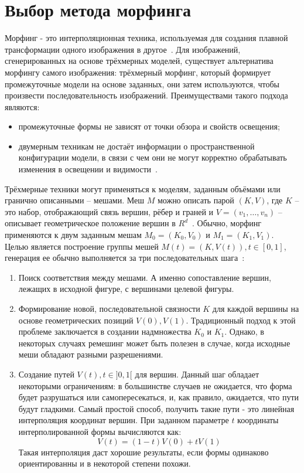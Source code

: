 \section{Выбор метода морфинга}
\label{sec:morph}
Морфинг - это интерполяционная техника, используемая для создания плавной трансформации одного изображения в другое~\cite{volume_morph}. Для изображений, сгенерированных на основе трёхмерных моделей, существует альтернатива морфингу самого изображения: трёхмерный морфинг, который формирует промежуточные модели на основе заданных, они затем используются, чтобы произвести последовательность изображений. Преимуществами такого подхода являются:
\begin{itemize}
	\item промежуточные формы не зависят от точки обзора и свойств освещения;
	\item двумерным техникам не достаёт информации о пространственной конфигурации модели, в связи с чем они не могут корректно обрабатывать изменения в освещении и видимости~\cite{volume_morph}.
\end{itemize}
Трёхмерные техники могут применяться к моделям, заданным объёмами или гранично описанными -- мешами. Меш $M$ можно описать парой $(K, V)$, где $K$ -- это набор, отображающий связь вершин, рёбер и граней и $V = (v_{1},\dots,v_{n})$ -- описывает геометрическое положение вершин в $R^{d}$~\cite{alexa}. Обычно, морфинг применяются к двум заданным мешам $M_{0}=(K_{0},V_{0})$ и $M_{1}=(K_{1},V_{1})$. Целью является построение группы мешей $M(t)=(K,V(t)),t\in[0,1]$, генерация ее обычно выполняется за три последовательных шага~\cite{alexa}:
\begin{enumerate}[1.]
	\item Поиск соответствия между мешами. А именно сопоставление вершин, лежащих в исходной фигуре, с вершинами целевой фигуры.
	\item Формирование новой, последовательной связности $K$ для каждой вершины на основе геометрических позиций $V(0), V(1)$. Традиционный подход к этой проблеме заключается в создании надмножества $K_{0}$ и $K_{1}$. Однако, в некоторых случаях ремешинг может быть полезен в случае, когда исходные меши обладают разными разрешениями.
	\item Создание путей $V(t),t\in]0,1[$ для вершин. Данный шаг обладает некоторыми ограничениям: в большинстве случаев не ожидается, что форма будет разрушаться или самопересекаться, и, как правило, ожидается, что пути будут гладкими. Самый простой способ, получить такие пути - это линейная интерполяция координат вершин. При заданном параметре $t$ координаты интерполированной формы вычисляются как:
	\begin{equation}
	V(t)=(1-t)V(0)+tV(1)
	\end{equation}
	Такая интерполяция даст хорошие результаты, если формы одинаково ориентированны и в некоторой степени похожи.
\end{enumerate}
